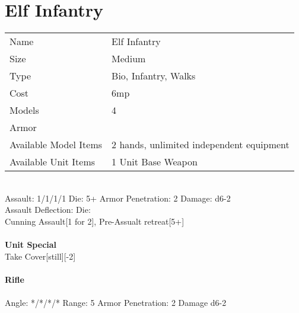 \pagebreak

\section{ Elf Infantry }

\begin{tabular}{ll}
  Name & Elf Infantry \\
  Size & Medium\\
  Type & Bio, Infantry, Walks\\
  Cost & 6mp\\
  Models & 4\\
  Armor & \\
  Available Model Items & 2 hands, unlimited independent equipment \\
  Available Unit Items & 1 Unit Base Weapon \\
\end{tabular}

\ \\
Assault: 1/1/1/1 Die: 5+ Armor Penetration: 2 Damage: d6-2 \\
Assault Deflection:  Die: \\
\indent Cunning Assault[1 for 2], Pre-Assualt retreat[5+] \\
\ \\

{\bf Unit Special} \\
Take Cover[still][-2]
\ \\
\ \\
{\bf Rifle } \\
\ \\
Angle: */*/*/* Range: 5 Armor Penetration: 2 Damage d6-2 \\
\indent  \\





